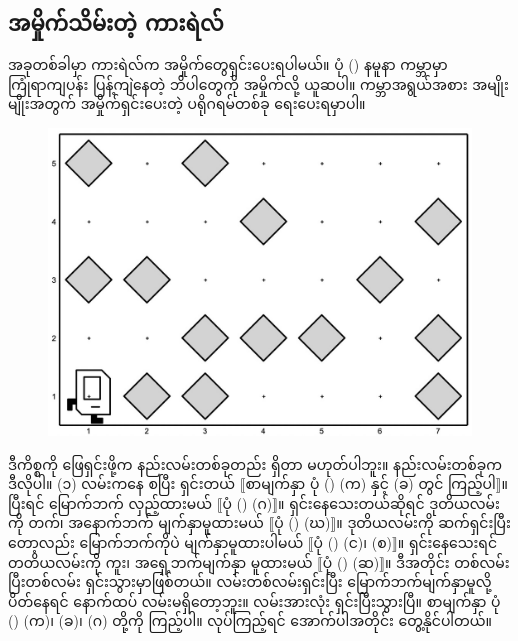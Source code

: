 \subsection*{အမှိုက်သိမ်းတဲ့ ကားရဲလ်}
အခုတစ်ခါမှာ ကားရဲလ်က အမှိုက်တွေရှင်းပေးရပါမယ်။ ပုံ (\fRefNo{\ref{fig:stw}}) နမူနာ ကမ္ဘာမှာ ကြုံရာကျပန်း  ပြန့်ကျဲနေတဲ့ ဘိပါတွေကို အမှိုက်လို့ ယူဆပါ။  ကမ္ဘာအရွယ်အစား အမျိုးမျိုးအတွက် အမှိုက်ရှင်းပေးတဲ့ ပရိုဂရမ်တစ်ခု ရေးပေးရမှာပါ။
\begin{figure}[htb!]
    {\includegraphics[width=.5\linewidth]{images/ch03/clean_the_world/init_w1.jpg}}
\caption{}
\label{fig:stw}
\end{figure}

ဒီကိစ္စကို ဖြေရှင်းဖို့က နည်းလမ်းတစ်ခုတည်း ရှိတာ မဟုတ်ပါဘူး။ နည်းလမ်းတစ်ခုက ဒီလိုပါ။ (၁) လမ်းကနေ စပြီး ရှင်းတယ် $\big\llbracket$စာမျက်နှာ \fRefNo{\pageref{fig:stw_alg1}} ပုံ (\fRefNo{\ref{fig:stw_alg1}}) (က) နှင့် (ခ) တွင် ကြည့်ပါ$\big\rrbracket$။ ပြီးရင် မြောက်ဘက် လှည့်ထားမယ် $\big\llbracket$ပုံ (\fRefNo{\ref{fig:stw_alg1}}) (ဂ)$\big\rrbracket$။ ရှင်းနေသေးတယ်ဆိုရင် ဒုတိယလမ်းကို တက်၊ အနောက်ဘက် မျက်နှာမူထားမယ် $\big\llbracket$ပုံ (\fRefNo{\ref{fig:stw_alg1}}) (ဃ)$\big\rrbracket$။ ဒုတိယလမ်းကို ဆက်ရှင်းပြီးတော့လည်း မြောက်ဘက်ကိုပဲ မျက်နှာမူထားပါမယ် $\big\llbracket$ပုံ (\fRefNo{\ref{fig:stw_alg1}}) (‌င)၊ (စ)$\big\rrbracket$။ ရှင်းနေသေးရင် တတိယလမ်းကို ကူး၊ အရှေ့ဘက်မျက်နှာ မူထားမယ် $\big\llbracket$ပုံ (\fRefNo{\ref{fig:stw_alg1}}) (ဆ)$\big\rrbracket$။ ဒီအတိုင်း တစ်လမ်းပြီးတစ်လမ်း ရှင်းသွားမှာဖြစ်တယ်။ လမ်းတစ်လမ်းရှင်းပြီး မြောက်ဘက်မျက်နှာမူလို့ ပိတ်နေရင် နောက်ထပ် လမ်းမရှိတော့ဘူး။ လမ်းအားလုံး ရှင်းပြီးသွားပြီ။ စာမျက်နှာ \fRefNo{\pageref{fig:stw_alg1_last_st}} ပုံ (\fRefNo{\ref{fig:stw_alg1_last_st}}) (က)၊ (ခ)၊ (ဂ) တို့ကို ကြည့်ပါ။  လုပ်ကြည့်ရင် အောက်ပါအတိုင်း တွေ့နိုင်ပါတယ်။ 

